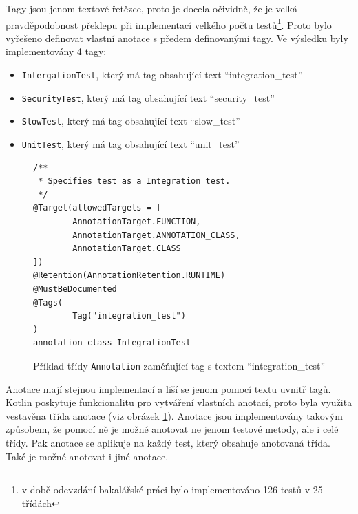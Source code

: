     Tagy jsou jenom textové řetězce, proto je docela očividně, že je velká pravděpodobnost překlepu při implementací velkého počtu testů\footnote{v době odevzdání bakalářské práci bylo implementováno 126 testů v 25 třídách}. Proto bylo vyřešeno definovat vlastní anotace s předem definovanými tagy. Ve výsledku byly implementovány 4 tagy:
    \begin{itemize}
            \item \verb|IntergationTest|, který má tag obsahující text \enquote{integration\_test}
            \item \verb|SecurityTest|, který má tag obsahující text \enquote{security\_test}
            \item \verb|SlowTest|, který má tag obsahující text \enquote{slow\_test}
            \item \verb|UnitTest|, který má tag obsahující text \enquote{unit\_test}
    \end{itemize}
    
    \begin{figure}
        \begin{verbatim}
/**
 * Specifies test as a Integration test.
 */
@Target(allowedTargets = [
        AnnotationTarget.FUNCTION,
        AnnotationTarget.ANNOTATION_CLASS,
        AnnotationTarget.CLASS
])
@Retention(AnnotationRetention.RUNTIME)
@MustBeDocumented
@Tags(
        Tag("integration_test")
)
annotation class IntegrationTest
        \end{verbatim}
        \caption{Příklad třídy \texttt{Annotation} zaměňující tag s textem \enquote{integration\_test}} 
        \label{code:annotation-class}
    \end{figure}
    Anotace mají stejnou implementací a liší se jenom pomocí textu uvnitř tagů. Kotlin poskytuje funkcionalitu pro vytváření vlastních anotací, proto byla využita vestavěna třída anotace (viz obrázek \ref{code:annotation-class}). Anotace jsou implementovány takovým způsobem, že pomocí ně je možné anotovat ne jenom testové metody, ale i celé třídy. Pak anotace se aplikuje na každý test, který obsahuje anotovaná třída. Také je možné anotovat i jiné anotace.

